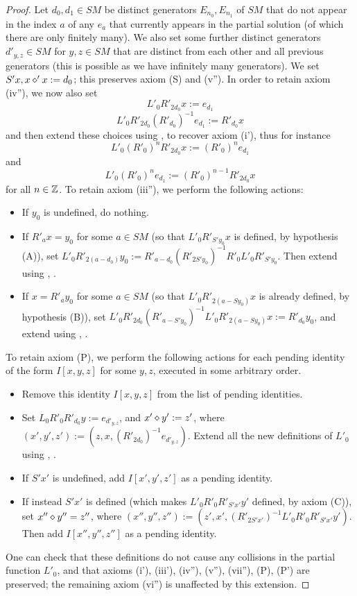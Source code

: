 \begin{proof}  Let $d_0, d_1 \in SM$ be distinct generators $E_{n_0}, E_{n_1}$ of $SM$ that do not appear in the index $a$ of any $e_a$ that currently appears in the partial solution (of which there are only finitely many).  We also set some further distinct generators $d'_{y,z} \in SM$ for $y,z \in SM$ that are distinct from each other and all previous generators (this is possible as we have infinitely many generators).  We set $S'x,  x \diamond' x := d_0$; this preserves axiom (S) and (v'').  In order to retain axiom (iv''), we now also set
$$ L'_0 R'_{2d_0} x := e_{d_1}$$
$$ L'_0 R'_{2d_0} (R'_{d_0})^{-1} e_{d_1} := R'_{d_0} x$$
and then extend these choices using ,  to recover axiom (i'), thus for instance
$$ L'_0 (R'_0)^n R'_{2d_0} x := (R'_0)^n e_{d_1}$$
and
$$ L'_0 (R'_0)^n e_{d_1}  := (R'_0)^{n-1} R'_{2d_0} x$$
for all $n \in \mathbb{Z}$.  To retain axiom (iii''), we perform the following actions:
\begin{itemize}
\item If $y_0$ is undefined, do nothing.
\item If $R'_a x = y_0$ for some $a \in SM$ (so that $L'_0 R'_{S'y_0} x$ is defined, by hypothesis (A)), set $L'_0 R'_{2(a-d_0)} y_0 := R'_{a-d_0} (R'_{2S'y_0})^{-1} R'_0 L'_0 R'_{S'y_0}$. Then extend using , .
\item If $x = R'_a y_0$ for some $a \in SM$ (so that $L'_0 R'_{2(a-Sy_0)} x$ is already defined, by hypothesis (B)), set $L'_0 R'_{2d_0} (R'_{a-S'y_0})^{-1} L'_0 R'_{2(a-Sy_0)} x :=R'_{d_0} y_0$, and extend using , .
\end{itemize}
To retain axiom (P), we perform the following actions for each pending identity of the form $I[x,y,z]$ for some $y,z$, executed in some arbitrary order.
\begin{itemize}
\item Remove this identity $I[x,y,z]$ from the list of pending identities.
\item Set $L_0 R'_0 R'_{d_0} y := e_{d'_{y,z}}$, and $x' \diamond y' := z'$, where $(x',y',z') := (z, x, (R'_{2d_0})^{-1} e_{d'_{y,z}})$. Extend all the new definitions of $L'_0$ using , .
\item If $S'x'$ is undefined, add $I[x',y',z']$ as a pending identity.
\item If instead $S'x'$ is defined (which makes $L'_0 R'_0 R'_{S'x'} y'$ defined, by axiom (C)), set $x'' \diamond y'' = z''$, where $(x'',y'',z'') := (z', x', (R'_{2S'x'})^{-1} L'_0 R'_0 R'_{S'x'} y')$.  Then add $I[x'',y'',z'']$ as a pending identity.
\end{itemize}
One can check that these definitions do not cause any collisions in the partial function $L'_0$, and that axioms (i'), (iii'), (iv''), (v''), (vii''), (P), (P') are preserved; the remaining axiom (vi'') is unaffected by this extension.
\end{proof}



